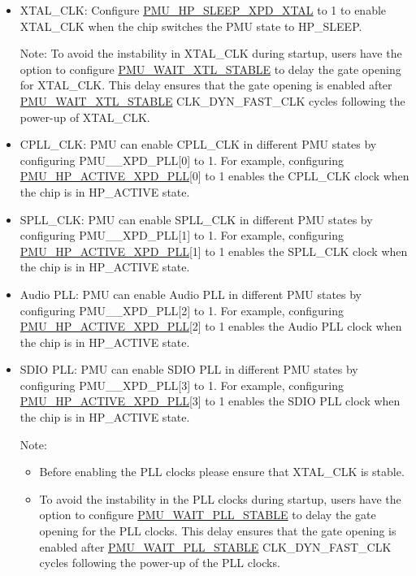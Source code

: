 \documentclass[main\_\_EN.tex]{subfiles}
\begin{document}
\begin{itemize}
    \item XTAL\_CLK: Configure \hyperref[fielddesc:PMUHPSLEEPXPDXTAL]{PMU\_HP\_SLEEP\_XPD\_XTAL} to 1 to enable XTAL\_CLK when the chip switches the PMU state to HP\_SLEEP.

    Note: To avoid the instability in XTAL\_CLK during startup, users have the option to configure \hyperref[fielddesc:PMUWAITXTLSTABLE]{PMU\_WAIT\_XTL\_STABLE} to delay the gate opening for XTAL\_CLK. This delay ensures that the gate opening is enabled after \hyperref[fielddesc:PMUWAITXTLSTABLE]{PMU\_WAIT\_XTL\_STABLE} CLK\_DYN\_FAST\_CLK cycles following the power-up of XTAL\_CLK.

    \item CPLL\_CLK: PMU can enable CPLL\_CLK in different PMU states by configuring PMU\_\_XPD\_PLL[0] to 1. For example, configuring \hyperref[fielddesc:PMUHPACTIVEXPDPLL]{PMU\_HP\_ACTIVE\_XPD\_PLL}[0] to 1 enables the CPLL\_CLK clock when the chip is in HP\_ACTIVE state.

    \item SPLL\_CLK: PMU can enable SPLL\_CLK in different PMU states by configuring PMU\_\_XPD\_PLL[1] to 1. For example, configuring \hyperref[fielddesc:PMUHPACTIVEXPDPLL]{PMU\_HP\_ACTIVE\_XPD\_PLL}[1] to 1 enables the SPLL\_CLK clock when the chip is in HP\_ACTIVE state.

    \item Audio PLL: PMU can enable Audio PLL in different PMU states by configuring PMU\_\_XPD\_PLL[2] to 1. For example, configuring \hyperref[fielddesc:PMUHPACTIVEXPDPLL]{PMU\_HP\_ACTIVE\_XPD\_PLL}[2] to 1 enables the Audio PLL clock when the chip is in HP\_ACTIVE state.

    \item SDIO PLL: PMU can enable SDIO PLL in different PMU states by configuring PMU\_\_XPD\_PLL[3] to 1. For example, configuring \hyperref[fielddesc:PMUHPACTIVEXPDPLL]{PMU\_HP\_ACTIVE\_XPD\_PLL}[3] to 1 enables the SDIO PLL clock when the chip is in HP\_ACTIVE state.

    Note:
    \begin{itemize}
        \item Before enabling the PLL clocks please ensure that XTAL\_CLK is stable.

        \item To avoid the instability in the PLL clocks during startup, users have the option to configure \hyperref[fielddesc:PMUWAITPLLSTABLE]{PMU\_WAIT\_PLL\_STABLE} to delay the gate opening for the PLL clocks. This delay ensures that the gate opening is enabled after \hyperref[fielddesc:PMUWAITPLLSTABLE]{PMU\_WAIT\_PLL\_STABLE} CLK\_DYN\_FAST\_CLK cycles following the power-up of the PLL clocks.
    \end{itemize}
\end{itemize}
\end{document}
